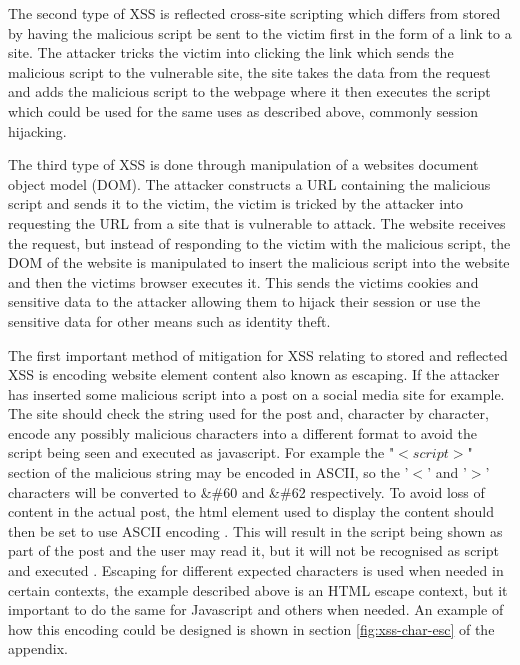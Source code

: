 \documentclass{ueacmpstyle}
\begin{document}
      The second type of XSS is reflected cross-site scripting which differs from stored 
      by having the malicious script be sent to the victim first in the form of a link to 
      a site. The attacker tricks the victim into clicking the link which sends the 
      malicious script to the vulnerable site, the site takes the data from the request and 
      adds the malicious script to the webpage where it then executes the script which could 
      be used for the same uses as described above, commonly session hijacking.

      The third type of XSS is done through manipulation of a websites document object model 
      (DOM). The attacker constructs a URL containing the malicious script and sends it to 
      the victim, the victim is tricked by the attacker into requesting the URL from a site 
      that is vulnerable to attack. The website receives the request, but instead of 
      responding to the victim with the malicious script, the DOM of the website is manipulated 
      to insert the malicious script into the website and then the victims browser executes it. 
      This sends the victims cookies and sensitive data to the attacker allowing them to hijack 
      their session or use the sensitive data for other means such as identity theft.

      The first important method of mitigation for XSS relating to stored and reflected XSS is 
      encoding website element content also known as escaping. If the attacker has inserted 
      some malicious script into a post on a social media site for example. The site should 
      check the string used for the post and, character by character, encode any possibly 
      malicious characters into a different format to avoid the script being seen and 
      executed as javascript. For example the "$<script>$" section of the malicious string 
      may be encoded in ASCII, so the '$<$' and '$>$' characters will be converted to \&\#60 
      and \&\#62 respectively. To avoid loss of content in the actual post, the html element 
      used to display the content should then be set to use ASCII encoding . This will result 
      in the script being shown as part of the post and the user may read it, but it will not 
      be recognised as script and executed \citep{IBMProtectFromXSS}. Escaping for different 
      expected characters is used when needed in certain contexts, the example described 
      above is an HTML escape context, but it important to do the same for Javascript and 
      others when needed. An example of how this encoding could be designed is shown in 
      section \ref{fig:xss-char-esc} of the appendix. 
\end{document}
